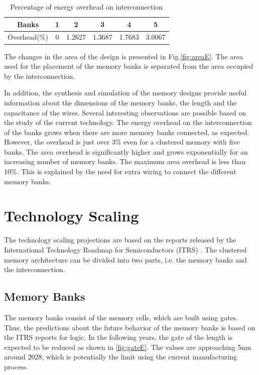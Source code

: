 \documentclass[12pt,a4paper]{article}
\begin{document}
 \begin{table}[t!]
\caption{Percentage of energy overhead on interconnection}
\label{tab:overhead}
\centering
\begin{tabular}{|c|c|c|c|c|c|}
\hline 
Banks & 1 & 2 & 3 & 4 & 5 \\
\hline 
Overhead(\%) & 0	&	1.2627 & 1.3687 & 1.7683 & 3.0067 \\ 
 \hline 
 \end{tabular} 
\end{table} 
 
The changes in the area of the design is presented in Fig.\ref{fig:areaE}.
The area used for the placement of the memory banks is separated from the area occupied by the interconnection.
  
In addition, the synthesis and simulation of the memory designs provide useful information about the dimensions of the memory banks, the length and the capacitance of the wires.
Several interesting observations are possible based on the study of the current technology.
The energy overhead on the interconnection of the banks grows when there are more memory banks connected, as expected.
However, the overhead is just over 3\% even for a clustered memory with five banks. 
The area overhead is significantly higher and grows exponentially for an increasing number of memory banks.  
The maximum area overhead is less than 10\%.
This is explained by the need for extra wiring to connect the different memory banks.

\section{Technology Scaling}

The technology scaling projections are based on the reports released by the International Technology Roadmap for Semiconductors (ITRS) \cite{itrs}.
The clustered memory architecture can be divided into two parts, i.e. the memory banks and the interconnection.

\subsection{Memory Banks}

The memory banks consist of the memory cells, which are built using gates.
Thus, the predictions about the future behavior of the memory banks is based on the ITRS reports for logic.
In the following years, the gate of the length is expected to be reduced as shown in \ref{fig:gateE}.
The values are approaching 5nm around 2028, which is potentially the limit using the current manufacturing process.
\end{document}

